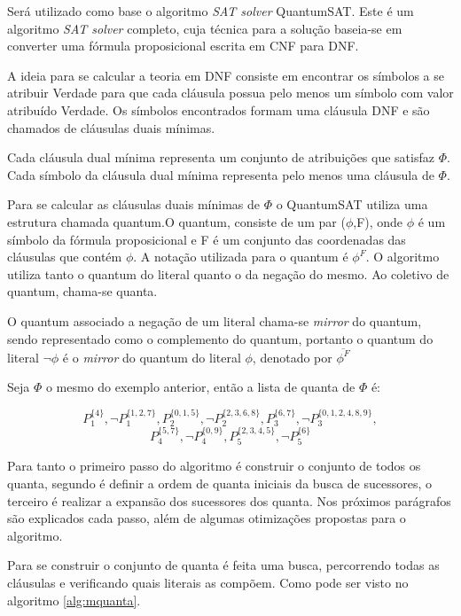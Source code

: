 \documentclass{ufsc-thesis}
\begin{document}
Será utilizado como base o algoritmo \textit{SAT solver} QuantumSAT\allowbreak\cite{bittencourt2003syntactic}. 
Este é um algoritmo \textit{SAT solver} completo, cuja técnica para 
a solução baseia-se em converter uma fórmula proposicional 
escrita em CNF para DNF. 

A ideia para se calcular a teoria em DNF consiste em encontrar os 
símbolos a se atribuir Verdade para que cada cláusula possua pelo 
menos um símbolo com valor atribuído Verdade. Os símbolos encontrados 
formam uma cláusula DNF e são chamados de cláusulas duais mínimas.

Cada cláusula dual mínima representa um conjunto de atribuições que 
satisfaz $\Phi$. Cada símbolo da cláusula dual mínima representa 
pelo menos uma cláusula de $\Phi$. 


Para se calcular as cláusulas duais mínimas de $\Phi$ o QuantumSAT utiliza 
uma estrutura chamada quantum.O quantum, consiste de um 
par ($\phi$,F), onde $\phi$ é um símbolo da fórmula proposicional e 
F é um conjunto das coordenadas das cláusulas que contém $\phi$. A 
notação utilizada para o quantum é $\phi^F$. O algoritmo utiliza 
tanto o quantum do literal quanto o da negação do mesmo. Ao coletivo 
de quantum, chama-se quanta.

O quantum associado a negação de um literal chama-se \textit{mirror} 
do quantum, sendo representado como o complemento do quantum, portanto
o quantum do literal $\neg \phi$ é o \textit{mirror} do quantum do 
literal $\phi$, denotado por $\overline{\phi^F}$

Seja $\Phi$ o mesmo do exemplo anterior, então a lista de quanta de $\Phi$ é:

$$P_1^{\{4\}}, \neg P_1^{\{1,2,7\}}, P_2^{\{0,1,5\}}, \neg P_2^{\{2,3,6,8\}},
P_3^{\{6,7\}}, \neg P_3^{\{0,1,2,4,8,9\}}, $$
$$P_4^{\{5,7\}}, \neg P_4^{\{0,9\}}, 
P_5^{\{2,3,4,5\}}, \neg P_5^{\{6\}}$$

Para tanto o primeiro passo do algoritmo é construir o conjunto
de todos os quanta, segundo é definir a ordem de quanta iniciais 
da busca de sucessores, o terceiro é realizar a expansão dos sucessores dos quanta. Nos 
próximos parágrafos são explicados cada passo, além de algumas 
otimizações propostas para o algoritmo.

Para se construir o conjunto de quanta é feita uma busca, percorrendo 
todas as cláusulas e verificando quais literais as 
compõem. Como pode ser visto no algoritmo \ref{alg:mquanta}.
\end{document}
